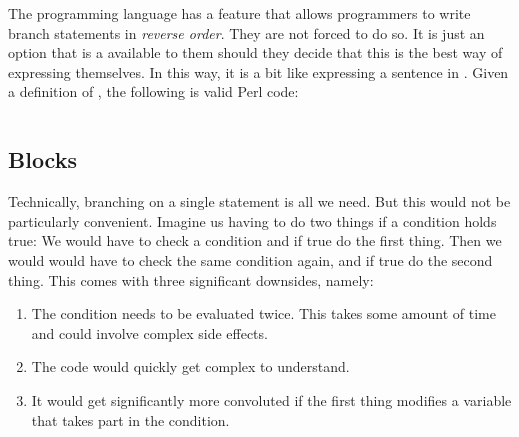 The  programming language has a feature that allows programmers to write branch statements in \textsl{reverse order}. They are not forced to do so. It is just an option that is a available to them should they decide that this is the best way of expressing themselves. In this way, it is a bit like expressing a sentence in . Given a definition of , the following is valid Perl code:

\inputminted[firstline=5]{perl}{../src/perl/branch/revorder/revorder.pl}


\subsection{Blocks}

Technically, branching on a single statement is all we need. But this would not be particularly convenient. Imagine us having to do two things if a condition holds true: We would have to check a condition and if true do the first thing. Then we would would have to check the same condition again, and if true do the second thing. This comes with three significant downsides, namely:
\begin{enumerate}
  \item The condition needs to be evaluated twice. This takes some amount of time and could involve complex side effects.
  \item The code would quickly get complex to understand.
  \item It would get significantly more convoluted if the first thing modifies a variable that takes part in the condition.
\end{enumerate}


